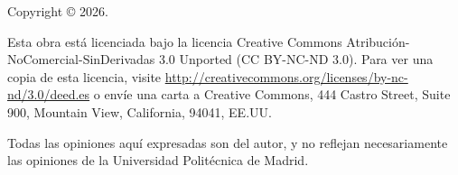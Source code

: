 \begin{flushleft}

Copyright \copyright{} 2026. \autortfg

Esta obra está licenciada bajo la licencia Creative Commons Atribución-NoComercial-SinDerivadas 3.0
Unported (CC BY-NC-ND 3.0). Para ver una copia de esta licencia, visite
\url{http://creativecommons.org/licenses/by-nc-nd/3.0/deed.es} o envíe una carta a Creative Commons,
444 Castro Street, Suite 900, Mountain View, California, 94041, EE.UU.


Todas las opiniones aquí expresadas son del autor, y no reflejan necesariamente las opiniones
de la Universidad Politécnica de Madrid.

\end{flushleft}

